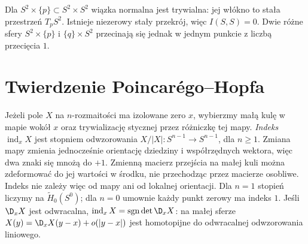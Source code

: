 \begin{przyklad}
Dla $S^2\times\{p\}
\subset S^2\times S^2$
wiązka normalna jest
trywialna: jej włókno
to stała przestrzeń
$T_pS^2$. Istnieje
niezerowy stały
przekrój, więc
$I(S,S)=0$.
Dwie różne sfery
$S^2\times\{p\}$
i $\{q\}\times S^2$
przecinają się
jednak w jednym
punkcie z liczbą
przecięcia $1$.
\end{przyklad}

\section{Twierdzenie Poincarégo--Hopfa}
\label{sec:poincare-hopf-16}

\begin{definicja}
Jeżeli pole $X$ na
$n$-rozmaitości ma
izolowane zero $x$,
wybierzmy małą kulę w mapie wokół $x$
oraz trywializację stycznej przez różniczkę tej mapy.
\emph{Indeks} $\operatorname{ind}_x X$
jest stopniem odwzorowania
$X/|X|:S^{n-1}\to S^{n-1}$, dla $n\geq1$.
Zmiana mapy zmienia jednocześnie orientację dziedziny
i współrzędnych wektora, więc dwa znaki się mnożą
do $+1$. Zmienną macierz przejścia na małej kuli
można zdeformować do jej wartości w środku, nie
przechodząc przez macierze osobliwe. Indeks nie
zależy więc od mapy ani od lokalnej orientacji.
Dla $n=1$ stopień liczymy na $\widetilde H_0(S^0)$;
dla $n=0$ umownie każdy punkt zerowy ma indeks $1$.
Jeśli $\D_xX$ jest
odwracalna,
$\operatorname{ind}_xX
=\operatorname{sgn}\det\D_xX$:
na małej sferze
$X(y)=\D_xX(y-x)+o(|y-x|)$
jest homotopijne
do odwracalnej
odwzorowania liniowego.
\end{definicja}

